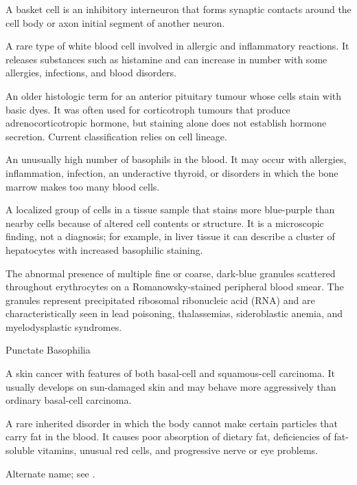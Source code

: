  A basket cell is an inhibitory interneuron that forms synaptic contacts around the cell body or axon initial segment of another neuron.

 A rare type of white blood cell involved in allergic and inflammatory reactions. It releases substances such as histamine and can increase in number with some allergies, infections, and blood disorders.

 An older histologic term for an anterior pituitary
tumour whose cells stain with basic dyes. It was often used for corticotroph
tumours that produce adrenocorticotropic hormone, but staining alone does not
establish hormone secretion. Current classification relies on cell lineage.

 An unusually high number of basophils in the blood. It may occur with allergies, inflammation, infection, an underactive thyroid, or disorders in which the bone marrow makes too many blood cells.

 A localized group of cells in a tissue sample that stains more blue-purple than nearby cells because of altered cell contents or structure. It is a microscopic finding, not a diagnosis; for example, in liver tissue it can describe a cluster of hepatocytes with increased basophilic staining.

 The abnormal presence of multiple fine or coarse, dark-blue granules scattered throughout erythrocytes on a Romanowsky-stained peripheral blood smear. The granules represent precipitated ribosomal ribonucleic acid (RNA) and are characteristically seen in lead poisoning, thalassemias, sideroblastic anemia, and myelodysplastic syndromes.

\synonyms
Punctate Basophilia

 A skin cancer with features of both basal-cell
and squamous-cell carcinoma. It usually develops on sun-damaged skin and may
behave more aggressively than ordinary basal-cell carcinoma.

 A rare inherited disorder in which the body cannot make certain particles that carry fat in the blood. It causes poor absorption of dietary fat, deficiencies of fat-soluble vitamins, unusual red cells, and progressive nerve or eye problems.

 Alternate name; see .

